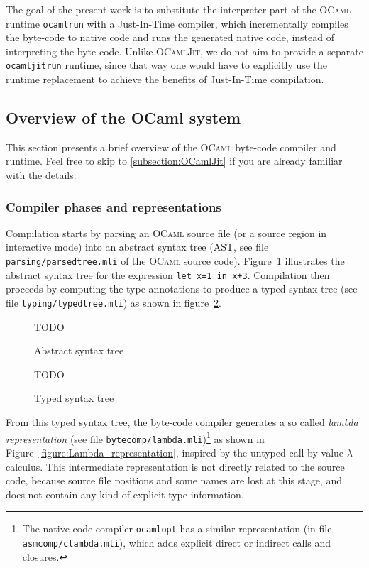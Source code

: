 \documentclass[10pt,a4paper,twocolumn]{article}
\begin{document}
The goal of the present work is to substitute the interpreter part of the \textsc{OCaml} runtime
\texttt{ocamlrun} with a Just-In-Time compiler, which incrementally compiles the byte-code to
native code and runs the generated native code, instead of interpreting the byte-code. Unlike
\textsc{OCamlJit}\cite{Starynkevitch04}, we do not aim to provide a separate \texttt{ocamljitrun}
runtime, since that way one would have to explicitly use the runtime replacement to achieve the
benefits of Just-In-Time compilation.

\subsection{Overview of the OCaml system}

This section presents a brief overview of the \textsc{OCaml} byte-code compiler and runtime.
Feel free to skip to \ref{subsection:OCamlJit} if you are already familiar with the details.

\subsubsection{Compiler phases and representations}

Compilation starts by parsing an \textsc{OCaml} source file (or a source region in interactive
mode) into an abstract syntax tree (AST, see file \texttt{parsing/parsedtree.mli} of the \textsc{OCaml}
source code). Figure~\ref{figure:Abstract_syntax_tree} illustrates the abstract syntax tree for the expression
\texttt{let x=1 in x+3}. Compilation then proceeds by computing the type annotations to produce
a typed syntax tree (see file \texttt{typing/typedtree.mli}) as shown in figure~\ref{figure:Typed_syntax_tree}.

\begin{figure}[ht]
  \centering
  TODO
  \caption{Abstract syntax tree}
  \label{figure:Abstract_syntax_tree}
\end{figure}

\begin{figure}[ht]
  \centering
  TODO
  \caption{Typed syntax tree}
  \label{figure:Typed_syntax_tree}
\end{figure}

From this typed syntax tree, the byte-code compiler generates a so called {\em lambda representation} (see
file \texttt{bytecomp/lambda.mli})\footnote{The native code compiler \texttt{ocamlopt} has a similar
  representation (in file \texttt{asmcomp/clambda.mli}), which adds explicit direct or indirect calls and
  closures.} as shown in Figure~\ref{figure:Lambda_representation}, inspired by
the untyped call-by-value $\lambda$-calculus. This intermediate representation is not directly related to the
source code, because source file positions and some names are lost at this stage, and does not contain any
kind of explicit type information.
\end{document}

